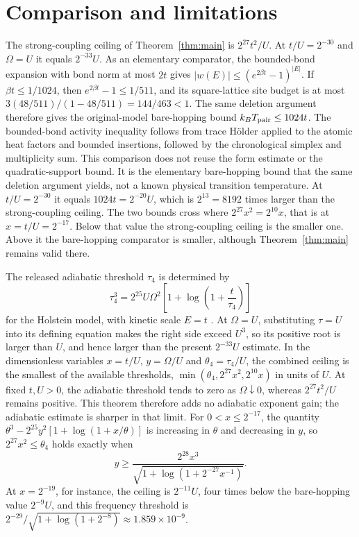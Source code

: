 \documentclass[11pt]{article}
\begin{document}
\section{Comparison and limitations}

The strong-coupling ceiling of Theorem~\ref{thm:main} is $2^{27}t^2/U$. At $t/U=2^{-30}$ and $\Omega=U$ it equals $2^{-33}U$. As an elementary comparator, the bounded-bond expansion with bond norm at most $2t$ gives $|w(E)|\le(e^{2\beta t}-1)^{|E|}$. If $\beta t\le1/1024$, then $e^{2\beta t}-1\le1/511$, and its square-lattice site budget is at most $3(48/511)/(1-48/511)=144/463<1$. The same deletion argument therefore gives the original-model bare-hopping bound $k_BT_{\rm pair}\le1024t$. The bounded-bond activity inequality follows from trace H\"older applied to the atomic heat factors and bounded insertions, followed by the chronological simplex and multiplicity sum. This comparison does not reuse the form estimate or the quadratic-support bound. It is the elementary bare-hopping bound that the same deletion argument yields, not a known physical transition temperature. At $t/U=2^{-30}$ it equals $1024t=2^{-20}U$, which is $2^{13}=8192$ times larger than the strong-coupling ceiling. The two bounds cross where $2^{27}x^2=2^{10}x$, that is at $x=t/U=2^{-17}$. Below that value the strong-coupling ceiling is the smaller one. Above it the bare-hopping comparator is smaller, although Theorem~\ref{thm:main} remains valid there.

The released adiabatic threshold $\tau_4$ is determined by
\[
 \tau_4^3=2^{25}U\Omega^2\left[1+\log\left(1+\frac{t}{\tau_4}\right)\right]
\]
for the Holstein model, with kinetic scale $E=t$ \cite{linear4}. At $\Omega=U$, substituting $\tau=U$ into its defining equation makes the right side exceed $U^3$, so its positive root is larger than $U$, and hence larger than the present $2^{-33}U$ estimate. In the dimensionless variables $x=t/U$, $y=\Omega/U$ and $\theta_4=\tau_4/U$, the combined ceiling is the smallest of the available thresholds, $\min(\theta_4,2^{27}x^2,2^{10}x)$ in units of $U$. At fixed $t,U>0$, the adiabatic threshold tends to zero as $\Omega\downarrow0$, whereas $2^{27}t^2/U$ remains positive. This theorem therefore adds no adiabatic exponent gain; the adiabatic estimate is sharper in that limit. For $0<x\le2^{-17}$, the quantity $\theta^3-2^{25}y^2[1+\log(1+x/\theta)]$ is increasing in $\theta$ and decreasing in $y$, so $2^{27}x^2\le\theta_4$ holds exactly when
\[
 y\ge\frac{2^{28}x^3}{\sqrt{1+\log\!\left(1+2^{-27}x^{-1}\right)}}.
\]
At $x=2^{-19}$, for instance, the ceiling is $2^{-11}U$, four times below the bare-hopping value $2^{-9}U$, and this frequency threshold is $2^{-29}/\sqrt{1+\log(1+2^{-8})}\approx1.859\times10^{-9}$.
\end{document}
